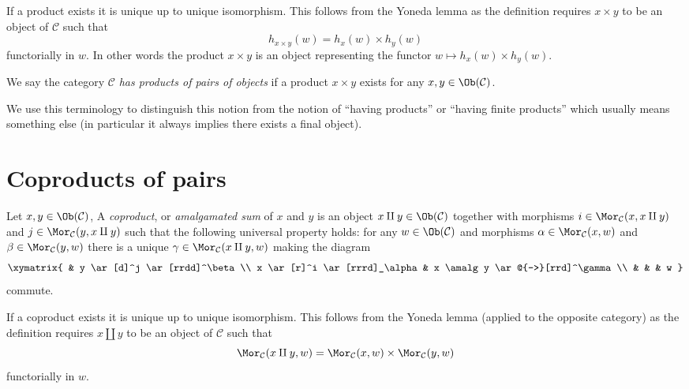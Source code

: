 \noindent
If a product exists it is unique up to unique
isomorphism. This follows from the Yoneda lemma as
the definition requires $x \times y$ to be an object
of $\mathcal{C}$ such that
$$
h_{x \times y}(w) = h_x(w) \times h_y(w)
$$
functorially in $w$. In other words the product $x \times y$
is an object representing the functor
$w \mapsto h_x(w) \times h_y(w)$.

\begin{definition}
\label{definition-has-products-of-pairs}
We say the category $\mathcal{C}$ {\it has products of pairs
of objects} if a product $x \times y$
exists for any $x, y \in \Ob(\mathcal{C})$.
\end{definition}

\noindent
We use this terminology to distinguish this notion from the notion
of ``having products'' or ``having finite products'' which usually means
something else (in particular it always implies there exists a
final object).





\section{Coproducts of pairs}
\label{section-coproducts-pairs}

\begin{definition}
\label{definition-coproducts}
Let $x, y \in \Ob(\mathcal{C})$,
A {\it coproduct}, or {\it amalgamated sum} of $x$ and $y$ is
an object $x \amalg y \in \Ob(\mathcal{C})$
together with morphisms
$i \in \Mor_{\mathcal C}(x, x \amalg y)$ and
$j \in \Mor_{\mathcal C}(y, x \amalg y)$ such
that the following universal property holds: for
any $w \in \Ob(\mathcal{C})$ and morphisms
$\alpha \in \Mor_{\mathcal C}(x, w)$ and
$\beta \in \Mor_\mathcal{C}(y, w)$
there is a unique
$\gamma \in \Mor_{\mathcal C}(x \amalg y, w)$ making
the diagram
$$
\xymatrix{
& y \ar[d]^j \ar[rrdd]^\beta \\
x \ar[r]^i \ar[rrrd]_\alpha & x \amalg y \ar@{-->}[rrd]^\gamma \\
& & & w
}
$$
commute.
\end{definition}

\noindent
If a coproduct exists it is unique up to unique
isomorphism. This follows from the Yoneda lemma (applied to the
opposite category) as
the definition requires $x \amalg y$ to be an object
of $\mathcal{C}$ such that
$$
\Mor_\mathcal{C}(x \amalg y, w) =
\Mor_\mathcal{C}(x, w) \times \Mor_\mathcal{C}(y, w)
$$
functorially in $w$.

